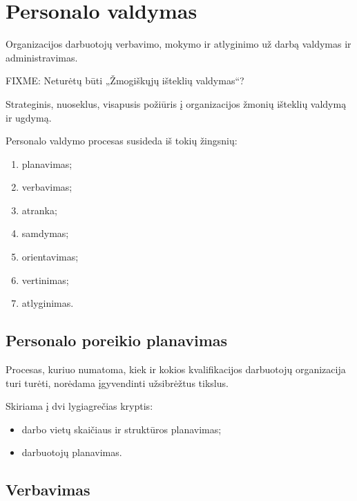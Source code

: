\chapter{Personalo valdymas}

\begin{defn}
  Organizacijos darbuotojų verbavimo, mokymo ir atlyginimo už darbą
  valdymas ir administravimas.
\end{defn}

\begin{defn}
  FIXME: Neturėtų būti „Žmogiškųjų išteklių valdymas“?
  
  Strateginis, nuoseklus, visapusis požiūris į organizacijos žmonių
  išteklių valdymą ir ugdymą.
\end{defn}

Personalo valdymo procesas susideda iš tokių žingsnių:
\begin{enumerate}
  \item planavimas;
  \item verbavimas;
  \item atranka;
  \item samdymas;
  \item orientavimas;
  \item vertinimas;
  \item atlyginimas.
\end{enumerate}

\section{Personalo poreikio planavimas}

\begin{defn}
  Procesas, kuriuo numatoma, kiek ir kokios kvalifikacijos darbuotojų
  organizacija turi turėti, norėdama įgyvendinti užsibrėžtus
  tikslus.
\end{defn}

Skiriama į dvi lygiagrečias kryptis:
\begin{itemize}
  \item darbo vietų skaičiaus ir struktūros planavimas;
  \item darbuotojų planavimas.
\end{itemize}

\section{Verbavimas}

